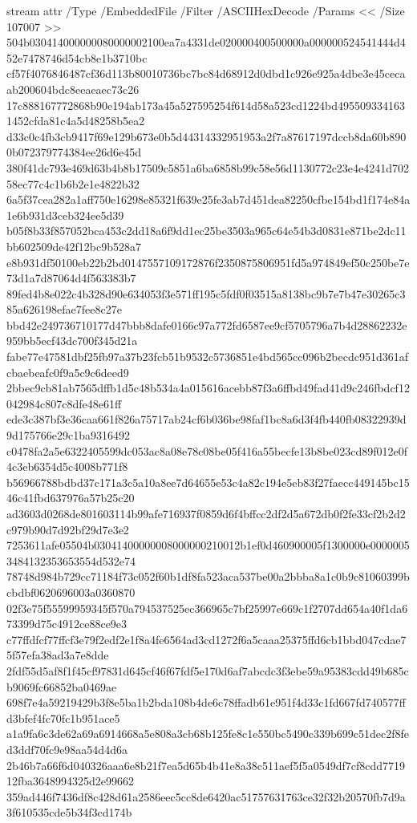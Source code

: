 \begingroup
{}
\immediate\pdfobj stream attr {
  /Type /EmbeddedFile /Filter /ASCIIHexDecode
  /Params << /Size 107007 >>
} {
504b030414000000080000002100ea7a4331de020000400500000a000000524541444d452e7478746d54cb8e1b3710bc
cf57f4076846487cf36d113b80010736bc7bc84d68912d0dbd1c926e925a4dbe3e45cecaab200604bdc8eeaeaec73c26
17c888167772868b90e194ab173a45a527595254f614d58a523cd1224bd4955093341631452cfda81c4a5d48258b5ea2
d33c0c4fb3cb9417f69e129b673e0b5d44314332951953a2f7a87617197dccb8da60b8900b072379774384ee26d6e45d
380f41dc793e469d63b4b8b17509c5851a6ba6858b99c58e56d1130772c23e4e4241d70258ec77c4c1b6b2e1e4822b32
6a5f37cea282a1aff750e16298e85321f639e25fe3ab7d451dea82250cfbe154bd1f174e84a1e6b931d3ceb324ee5d39
b05f8b33f857052bca453c2dd18a6f9dd1ec25be3503a965c64e54b3d0831e871be2dc11bb602509de42f12bc9b528a7
e8b931df50100eb22b2bd0147557109172876f2350875806951fd5a974849ef50c250be7e73d1a7d87064d4f563383b7
89fed4b8e022c4b328d90e634053f3e571ff195c5fdf0f03515a8138bc9b7e7b47e30265c385a626198efae7fee8c27e
bbd42e249736710177d47bbb8dafe0166c97a772fd6587ee9cf5705796a7b4d28862232e959bb5ecf43dc700f345d21a
fabe77e47581dbf25fb97a37b23fcb51b9532c5736851e4bd565cc096b2becdc951d361afcbaebeafc0f9a5c9c6deed9
2bbec9cb81ab7565dffb1d5c48b534a4a015616acebb87f3a6ffbd49fad41d9c246fbdcf12042984c807c8dfe48e61ff
ede3c387bf3e36caa661f826a75717ab24cf6b036be98faf1bc8a6d3f4fb440fb08322939d9d175766e29c1ba9316492
c0478fa2a5e6322405599dc053ac8a08e78c08be05f416a55becfe13b8be023cd89f012e0f4c3eb6354d5c4008b771f8
b56966788bdbd37c171a3c5a10a8ee7d64655e53c4a82c194e5eb83f27faecc449145bc1546c41fbd637976a57b25c20
ad3603d0268de801603114b99afe716937f0859d6f4bffcc2df2d5a672db0f2fe33cf2b2d2c979b90d7d92bf29d7e3e2
7253611afe05504b03041400000008000000210012b1ef0d460900005f1300000e00000053484132353653554d532e74
78748d984b729cc71184f73c052f60b1df8fa523aca537be00a2bbba8a1c0b9c81060399bcbdbf0620696003a0360870
02f3e75f55599959345f570a794537525ec366965c7bf25997e669c1f2707dd654a40f1da673399d75c4912ce88ce9e3
c77ffdfcf77ffcf3e79f2edf2e1f8a4fe6564ad3cd1272f6a5caaa25375ffd6cb1bbd047cdae75f57efa38ad3a7e8dde
2fdf55d5af8f1f45cf97831d645cf46f67fdf5e170d6af7abcdc3f3ebe59a95383cdd49b685cb9069fc66852ba0469ae
698f7e4a59219429b3f8e5ba1b2bda108b4de6c78ffadb61e951f4d33c1fd667fd740577ffd3bfef4fc70fc1b951ace5
a1a9fa6c3de62a69a6914668a5e808a3cb68b125fe8c1e550bc5490c339b699c51dec2f8fed3ddf70fc9e98aa54d4d6a
2b46b7a66f6d040326aaa6e8b21f7ea5d65b4b41e8a38c511aef5f5a0549df7cf8cdd771912fba3648994325d2e99662
359ad446f7436df8c428d61a2586eec5cc8de6420ac51757631763ce32f32b20570fb7d9a3f610535cde5b34f3cd174b
}
